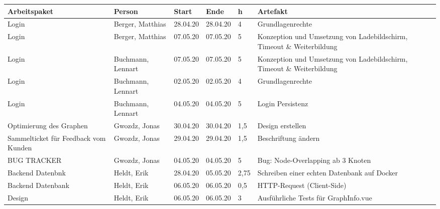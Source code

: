 \begin{longtable}{|p{4cm}|p{2cm}|p{1.2cm}|p{1.2cm}|p{0.7cm}|p{3.8cm}|}
  \hline
  Arbeitspaket                                                          & Person                & Start    & Ende     & h     & Artefakt \\
  \hline
  Login                                                                 & Berger, Matthias      & 28.04.20 & 28.04.20 & 4     & Grundlagenrechte \\
  \hline
  Login                                                                 & Berger, Matthias      & 07.05.20 & 07.05.20 & 5     & Konzeption und Umsetzung von Ladebildschirm, Timeout \& Weiterbildung \\
  \hline
  Login                                                                 & Buchmann, Lennart     & 07.05.20 & 07.05.20 & 5     & Konzeption und Umsetzung von Ladebildschirm, Timeout \& Weiterbildung \\
  \hline
  Login                                                                 & Buchmann, Lennart     & 02.05.20 & 02.05.20 & 4     & Grundlagenrechte \\
  \hline
  Login                                                                 & Buchmann, Lennart     & 04.05.20 & 04.05.20 & 5     & Login Persistenz \\
  \hline
  Optimierung des Graphen                                               & Gwozdz, Jonas         & 30.04.20 & 30.04.20 & 1,5   & Design erstellen \\
  \hline
  Sammelticket für Feedback vom Kunden                                  & Gwozdz, Jonas         & 29.04.20 & 29.04.20 & 1,5   & Beschriftung ändern \\
  \hline
  BUG TRACKER                                                           & Gwozdz, Jonas         & 04.05.20 & 04.05.20 & 5     & Bug: Node-Overlapping ab 3 Knoten \\
  \hline
  Backend Datenbnk                                                      & Heldt, Erik           & 28.04.20 & 05.05.20 & 2,75  & Schreiben einer echten Datenbank auf Docker \\
  \hline
  Backend Datenbank                                                     & Heldt, Erik           & 06.05.20 & 06.05.20 & 0,5   & HTTP-Request (Client-Side) \\
  \hline
  Design                                                                & Heldt, Erik           & 06.05.20 & 06.05.20 & 3     & Ausführliche Tests für GraphInfo.vue \\

\end{longtable}
